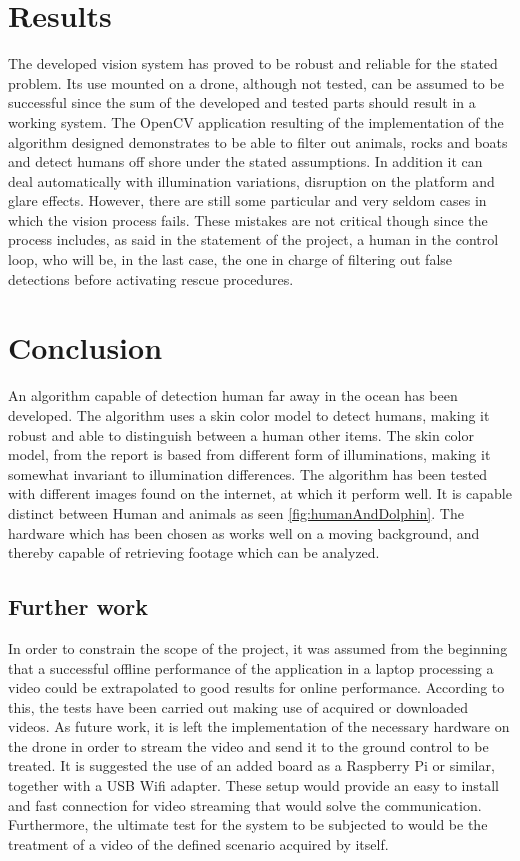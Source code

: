 \section{Results}
The developed vision system has proved to be robust and reliable for the stated problem.
Its use mounted on a drone, although not tested, can be assumed to be successful since the sum of the developed and tested parts should result in a working system.
The OpenCV application resulting of the implementation of the algorithm designed demonstrates to be able to filter out animals, rocks and boats and detect humans off shore under the stated assumptions. 
In addition it can deal automatically with illumination variations, disruption on the platform and glare effects.
However, there are still some particular and very seldom cases in which the vision process fails. 
These mistakes are not critical though since the process includes, as said in the statement of the project, a human in the control loop, who will be, in the last case, the one in charge of filtering out false detections before activating rescue procedures.

\section{Conclusion}

An algorithm capable of detection human far away in the ocean has been developed.  The algorithm uses a skin color model to detect humans, making it robust and able to distinguish between a human other items. The skin color model, from the report \cite{Ref:SkinDetection} is based from different form of illuminations,  making it somewhat invariant to illumination differences.  The algorithm has been tested with different images found on the internet, at which it perform well. It is capable distinct between Human and animals as seen \ref{fig:humanAndDolphin}.   The hardware which has been chosen as works well on a moving background, and thereby capable of retrieving footage which can be analyzed. 

\subsection{Further work} 
In order to constrain the scope of the project, it was assumed from the beginning that a successful offline performance of the application in a laptop processing a video could be extrapolated to good results for online performance. 
According to this, the tests have been carried out making use of acquired or downloaded videos.
As future work, it is left the implementation of the necessary hardware on the drone in order to stream the video and send it to the ground control to be treated.
It is suggested the use of an added board as a Raspberry Pi or similar, together with a USB Wifi adapter. These setup would provide an easy to install and fast connection for video streaming that would solve the communication.
Furthermore, the ultimate test for the system to be subjected to would be the treatment of a video of the defined scenario acquired by itself. 



\newpage
